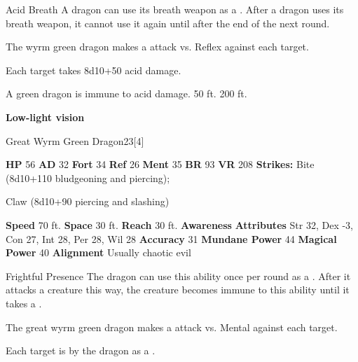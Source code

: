     \begin{freeability}{Acid Breath}
      A dragon can use its breath weapon as a .
      After a dragon uses its breath weapon, it cannot use it again until after the end of the next round.
      \par The wyrm green dragon makes a  attack
        vs. Reflex against each target.
    
    \hit Each target takes 8d10+50 acid damage.
    \end{freeability}
  
      
       A green dragon is immune to acid damage.
     50 ft.
     200 ft.
    \par\noindent\textbf{Low-light vision}
  

  \begin{monsubsection}{Great Wyrm Green Dragon}{23}[4]
    \vspace{-1em}\vspace{-1em}
    \vspace{0em}

    
    

    \begin{spellcontent}
      \begin{spelltargetinginfo}
        \pari \textbf{HP} 56 \monsep
          \textbf{AD} 32 \monsep
          \textbf{Fort} 34 \monsep
          \textbf{Ref} 26 \monsep
          \textbf{Ment} 35
        \pari \textbf{BR} 93 \monsep
        \textbf{VR} 208
        \pari \textbf{Strikes:}
            Bite  (8d10+110 bludgeoning and piercing);
\par Claw  (8d10+90 piercing and slashing)
      \end{spelltargetinginfo}
    \end{spellcontent}
    \begin{monsterfooter}
      \pari \textbf{Speed} 70 ft. \monsep
        \textbf{Space} 30 ft. \monsep
        \textbf{Reach} 30 ft.
      \pari \textbf{Awareness} 
      \pari \textbf{Attributes}
        Str 32, Dex -3,
        Con 27, Int 28,
        Per 28, Wil 28
      \pari \textbf{Accuracy} 31 \monsep
        \textbf{Mundane Power} 44 \monsep
      \textbf{Magical Power} 40
      \pari \textbf{Alignment} Usually chaotic evil
    \end{monsterfooter}
  \end{monsubsection}
  \begin{freeability}{Frightful Presence}
      The dragon can use this ability once per round as a .
      After it attacks a creature this way, the creature becomes immune to this ability until it takes a .
      \par The great wyrm green dragon makes a  attack
        vs. Mental against each target.
    
    \hit Each target is  by the dragon as a .
    \end{freeability}
  

